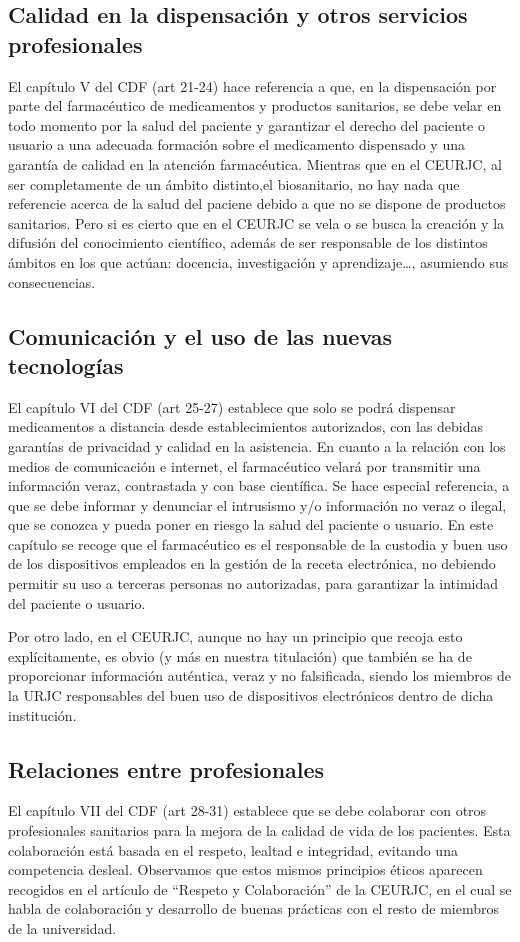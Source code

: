 \documentclass[11pt,a4paper]{article}
\begin{document}
\subsection{Calidad en la dispensación y otros servicios profesionales}
El capítulo V del CDF (art 21-24) hace referencia a que, en la dispensación por parte del farmacéutico de medicamentos y productos sanitarios, se debe velar en todo momento por la salud del paciente y garantizar el derecho del paciente o usuario a una adecuada formación sobre el medicamento dispensado y una garantía de calidad en la atención farmacéutica. Mientras que en el CEURJC, al ser completamente de un ámbito distinto,el biosanitario, no hay nada que referencie acerca de la salud del paciene debido a que no se dispone de productos sanitarios. Pero si es cierto que en el CEURJC se vela o se busca la creación y la difusión del conocimiento científico, además de ser responsable de los distintos ámbitos en los que actúan: docencia, investigación y aprendizaje…, asumiendo sus consecuencias.
 
\subsection{Comunicación y el uso de las nuevas tecnologías}
El capítulo VI del CDF (art 25-27) establece que solo se podrá dispensar medicamentos a distancia desde establecimientos autorizados, con las debidas garantías de privacidad y calidad en la asistencia. En cuanto a la relación con los medios de comunicación e internet, el farmacéutico velará por transmitir una información veraz, contrastada y con base científica. Se hace especial referencia, a que se debe informar y denunciar el intrusismo y/o información no veraz o ilegal, que se conozca y pueda poner en riesgo la salud del paciente o usuario. En este capítulo se recoge que el farmacéutico es el responsable de la custodia y buen uso de los dispositivos empleados en la gestión de la receta electrónica, no debiendo permitir su uso a terceras personas no autorizadas, para garantizar la intimidad del paciente o usuario.

Por otro lado, en el CEURJC, aunque no hay un principio que recoja esto explícitamente, es obvio (y más en nuestra titulación) que también se ha de proporcionar información auténtica, veraz y no falsificada, siendo los miembros de la URJC responsables del buen uso de dispositivos electrónicos dentro de dicha institución.

\subsection{Relaciones entre profesionales}
El capítulo VII del CDF (art 28-31) establece que se debe colaborar con otros profesionales sanitarios para la mejora de la calidad de vida de los pacientes. Esta colaboración está basada en el respeto, lealtad e integridad, evitando una competencia desleal. Observamos que estos mismos principios éticos aparecen recogidos en el artículo de “Respeto y Colaboración” de la CEURJC, en el cual se habla de colaboración y desarrollo de buenas prácticas con el resto de miembros de la universidad.
\end{document}

